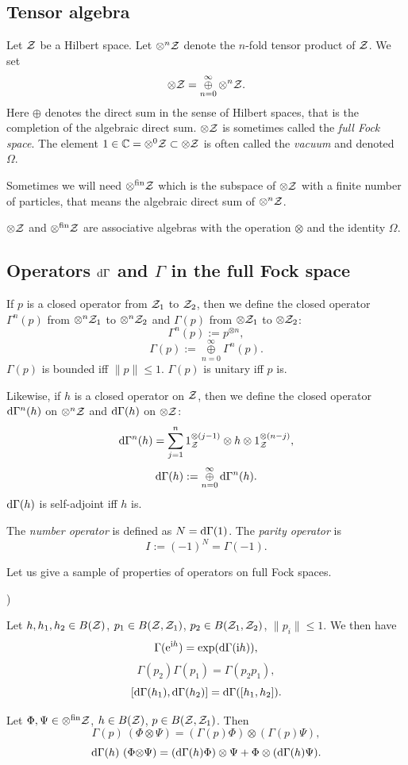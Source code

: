 \documentclass{svmult}
\newcounter{smallarabics}
\newenvironment{arabicenumerate}
{\begin{list}{{\normalfont\textrm{\arabic{smallarabics})}}}
  {\usecounter{smallarabics}\setlength{\itemindent}{0cm}
   \setlength{\leftmargin}{5ex}\setlength{\labelwidth}{4ex}
   \setlength{\topsep}{0.75\parsep}\setlength{\partopsep}{0ex}
   \setlength{\itemsep}{0ex}}}
{\end{list}}
\newcommand{\ben}{\begin{arabicenumerate}}
\newcommand{\een}{\end{arabicenumerate}}
\newcommand{\beq}{\begin{equation}}
\newcommand{\eeq}{\end{equation}}
\def\bet{\begin{theorem}}
\def\eet{\end{theorem}}
\def\cc{{\mathbb C}}
\def\cZ{{\cal Z}}
\def\fin{{\rm fin}}
\def\i{{\rm i}}
\def\loplus{\mathop{\oplus}\limits}
\def\e{{\rm e}}
\def\d{{\rm d}}
\def\loplus{\mathop{\oplus}\limits}
\def\e{{\rm e}}
\def\d{{\rm d}}
\begin{document}
\subsection{Tensor algebra}
Let $\cZ$ be  a Hilbert space.
Let $\otimes^n\cZ$ denote the $n$-fold tensor product of $\cZ$.
We set\[\otimes \cZ=\loplus\limits_{n=0}^\infty
\otimes^n\cZ.\]
Here $\oplus$ denotes the  direct sum in the sense of Hilbert spaces, that
is the completion of the algebraic direct sum.
$\otimes\cZ$ is sometimes called the {\em full Fock space}. 
The element $1\in\cc=\otimes^0\cZ\subset\otimes\cZ$ is often called
 the {\em vacuum }and denoted $\Omega$.


Sometimes we will need
$\otimes^\fin\cZ$ which is the subspace of $\otimes \cZ$ with a finite number
of particles, that means
the algebraic direct sum of $\otimes^n\cZ$.

$\otimes\cZ$ and $\otimes^\fin\cZ$ are
 associative
 algebras with the operation $\otimes$ and the identity $\Omega$. 




\subsection{Operators $\d\Gamma$ and $\Gamma$
in the full Fock space}
\label{5.3}


If $p$ is a closed operator from $\cZ_1$ to $\cZ_2$, then we define  the closed
operator $\Gamma^n(p)$
 from $\otimes^n\cZ_1 $ to $\otimes^n\cZ_2$ and $\Gamma(p)$
from  $\otimes\cZ_1
$ to $\otimes\cZ_2$:
\[\Gamma^n(p):=p^{\otimes n},     \]
\[\Gamma(p):=\loplus_{n=0}^\infty \Gamma^n(p).\]
$\Gamma(p)$ is  bounded iff $\|p\|\leq1$.
$\Gamma(p)$ is unitary iff $p$ is.

Likewise, if $h$ is a closed operator on $\cZ$,
 then we define the closed operator $\d\Gamma^n(h)$
 on $\otimes^n\cZ $  and $\d\Gamma(h)$ on  $\otimes\cZ$:
\[\d\Gamma^n(h)=\sum_{j=1}^n1_\cZ^{\otimes (j-1)}\otimes h\otimes
1_\cZ^{\otimes(n-j)},\]
\[\d\Gamma (h):=\loplus_{n=0}^\infty\d \Gamma^n(h)
.\] $\d\Gamma(h)$ is self-adjoint iff $h$ is.




The {\em number operator} is defined as $N=\d\Gamma(1)$.
The {\em parity operator }is 
\beq I:=(-1)^N=\Gamma(-1).\label{para0}\eeq

Let us give a sample of properties of operators on full Fock spaces.
\bet \ben
\item
 Let $h,h_1,h_2\in B(\cZ)$, 
$p_1\in B(\cZ,\cZ_1)$, $p_2\in B(\cZ_1,\cZ_2)$, $\|p_i\|\leq1$. We then have
\beq\Gamma(\e^{\i h})=\exp(\d\Gamma(\i h)),\label{piy}\eeq
\[\Gamma(p_2)\Gamma(p_1)=\Gamma(p_2 p_1),\]
\[[\d\Gamma(h_1),\d\Gamma(h_2)]=\d\Gamma([h_1,h_2]).\]
\item
 Let $\Phi,\Psi\in\otimes^\fin\cZ$,
 $h\in B(\cZ)$, $p\in B(\cZ,\cZ_1)$. Then
\[\Gamma(p)\ (\Phi\otimes \Psi)=(\Gamma(p)\Phi)\otimes(\Gamma(p)\Psi),\]
\[\d\Gamma(h)\ (\Phi{\otimes} \Psi)=(\d\Gamma(h)\Phi)\otimes \Psi
+\Phi\otimes(\d\Gamma(h)\Psi).\]
\een\eet
\end{document}
